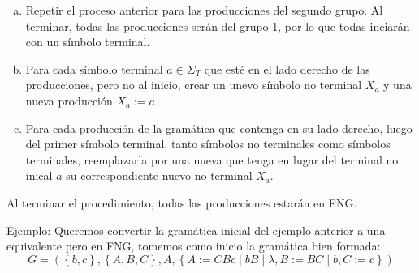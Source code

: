 \documentclass[12pt]{article}
\begin{document}
\begin{enumerate}[a)]
	  \item Repetir el proceso anterior para las producciones del segundo grupo. Al terminar, todas las producciones serán del grupo 1, por lo que todas inciarán con un símbolo terminal.

	  \item Para cada símbolo terminal $ a \in \Sigma_{T} $ que esté en el lado derecho de las producciones, pero no al inicio, crear un unevo símbolo no terminal $ X_{a} $ y una nueva producción $ X_{a}:=a $

	  \item Para cada producción de la gramática que contenga en su lado derecho, luego del primer símbolo terminal, tanto símbolos no terminales como símbolos terminales, reemplazarla por una nueva que tenga en lugar del terminal no inical $ a $ su correspondiente nuevo no terminal $ X_{a} $.
\end{enumerate}

Al terminar el procedimiento, todas las producciones estarán en FNG.

Ejemplo: Queremos convertir la gramática inicial del ejemplo anterior a una equivalente pero en FNG, tomemos como inicio la gramática bien formada:
\[
G = \left(\left\{b,c\right\},\left\{A,B,C\right\},A,\left\{A:=CBc \mid bB \mid \lambda,B:=BC \mid b,C:=c\right\}\right)
\]
\end{document}
